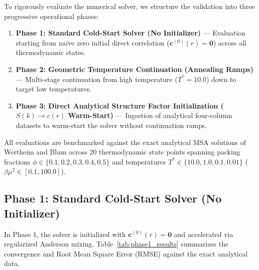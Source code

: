 \documentclass[11pt,a4paper]{article}
\begin{document}
To rigorously evaluate the numerical solver, we structure the validation into three progressive operational phases:
\begin{enumerate}
    \item \textbf{Phase 1: Standard Cold-Start Solver (No Initializer)} --- Evaluation starting from naive zero initial direct correlation ($\mathbf{c}^{(0)}(r) = \mathbf{0}$) across all thermodynamic states.
    \item \textbf{Phase 2: Geometric Temperature Continuation (Annealing Ramps)} --- Multi-stage continuation from high temperature ($T^* = 10.0$) down to target low temperatures.
    \item \textbf{Phase 3: Direct Analytical Structure Factor Initialization ($S(k) \to c(r)$ Warm-Start)} --- Ingestion of analytical four-column datasets to warm-start the solver without continuation ramps.
\end{enumerate}

All evaluations are benchmarked against the exact analytical MSA solutions of Wertheim and Blum across 20 thermodynamic state points spanning packing fractions $\phi \in \{0.1, 0.2, 0.3, 0.4, 0.5\}$ and temperatures $T^* \in \{10.0, 1.0, 0.1, 0.01\}$ ($\beta\mu^2 \in [0.1, 100.0]$).

\subsection{Phase 1: Standard Cold-Start Solver (No Initializer)}

In Phase 1, the solver is initialized with $\mathbf{c}^{(0)}(r) = \mathbf{0}$ and accelerated via regularized Anderson mixing. Table~\ref{tab:phase1_results} summarizes the convergence and Root Mean Square Error (RMSE) against the exact analytical data.
\end{document}
